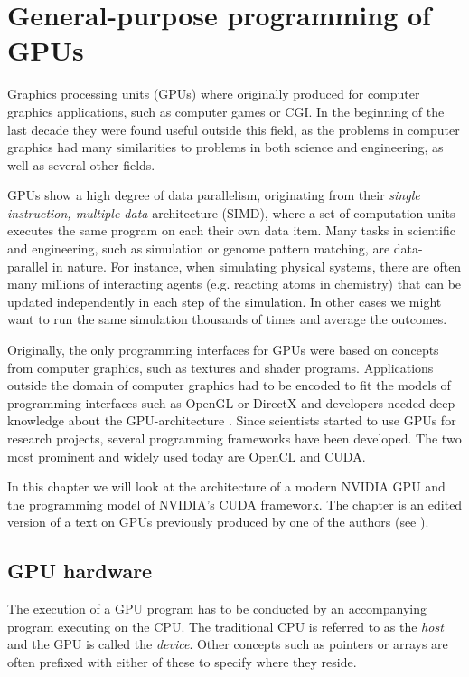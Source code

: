 \chapter{General-purpose programming of GPUs}
\label{chap:gpgpu}
Graphics processing units (GPUs) where originally produced for
computer graphics applications, such as computer games or CGI. In the
beginning of the last decade they were found useful outside this
field, as the problems in computer graphics had many similarities to
problems in both science and engineering, as well as several other
fields.

GPUs show a high degree of data parallelism, originating from their
\textit{single instruction, multiple data}-architecture (SIMD), where
a set of computation units executes the same program on each their own
data item. Many tasks in scientific and engineering, such as
simulation or genome pattern matching, are data-parallel in
nature. For instance, when simulating physical systems, there are
often many millions of interacting agents (e.g. reacting atoms in
chemistry) that can be updated independently in each step of the
simulation. In other cases we might want to run the same simulation
thousands of times and average the outcomes.

Originally, the only programming interfaces for GPUs were based on
concepts from computer graphics, such as textures and shader
programs. Applications outside the domain of computer graphics had to
be encoded to fit the models of programming interfaces such as OpenGL
or DirectX and developers needed deep knowledge about the
GPU-architecture \cite{nvidia2009fermi}. Since scientists started to
use GPUs for research projects, several programming frameworks have
been developed. The two most prominent and widely used today are
OpenCL and CUDA.

In this chapter we will look at
the architecture of a modern NVIDIA GPU and the programming model of
NVIDIA's CUDA framework. The chapter is an edited version of a text on
GPUs previously produced by one of the authors (see
\cite{dybdal2011opencl}).

\section{GPU hardware}
\label{sec:gpu_hardware}
The execution of a GPU program has to be conducted by an accompanying
program executing on the CPU. The traditional CPU is referred to as
the \textit{host} and the GPU is called the \textit{device}. Other
concepts such as pointers or arrays are often prefixed with either of
these to specify where they reside.

